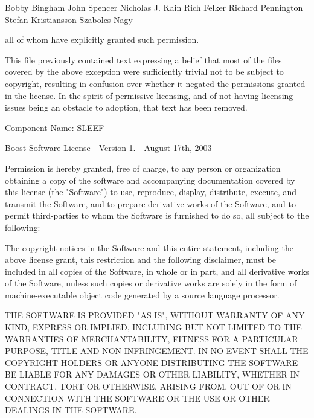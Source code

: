 Bobby Bingham John Spencer Nicholas J. Kain Rich Felker Richard Pennington Stefan Kristiansson Szabolcs Nagy

all of whom have explicitly granted such permission.

This file previously contained text expressing a belief that most of the files covered by the above exception were sufficiently trivial not to be subject to copyright, resulting in confusion over whether it negated the permissions granted in the license. In the spirit of permissive licensing, and of not having licensing issues being an obstacle to adoption, that text has been removed.

 Component Name\+: SLEEF

Boost Software License -\/ Version 1. -\/ August 17th, 2003

Permission is hereby granted, free of charge, to any person or organization obtaining a copy of the software and accompanying documentation covered by this license (the "{}\+Software"{}) to use, reproduce, display, distribute, execute, and transmit the Software, and to prepare derivative works of the Software, and to permit third-\/parties to whom the Software is furnished to do so, all subject to the following\+:

The copyright notices in the Software and this entire statement, including the above license grant, this restriction and the following disclaimer, must be included in all copies of the Software, in whole or in part, and all derivative works of the Software, unless such copies or derivative works are solely in the form of machine-\/executable object code generated by a source language processor.

THE SOFTWARE IS PROVIDED "{}\+AS IS"{}, WITHOUT WARRANTY OF ANY KIND, EXPRESS OR IMPLIED, INCLUDING BUT NOT LIMITED TO THE WARRANTIES OF MERCHANTABILITY, FITNESS FOR A PARTICULAR PURPOSE, TITLE AND NON-\/\+INFRINGEMENT. IN NO EVENT SHALL THE COPYRIGHT HOLDERS OR ANYONE DISTRIBUTING THE SOFTWARE BE LIABLE FOR ANY DAMAGES OR OTHER LIABILITY, WHETHER IN CONTRACT, TORT OR OTHERWISE, ARISING FROM, OUT OF OR IN CONNECTION WITH THE SOFTWARE OR THE USE OR OTHER DEALINGS IN THE SOFTWARE. 